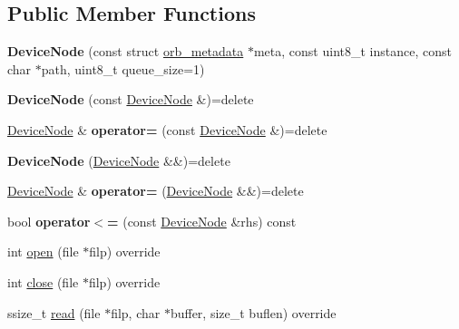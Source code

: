 \subsection*{Public Member Functions}
\begin{DoxyCompactItemize}
\item 
\mbox{\label{classuORB_1_1DeviceNode_a34467219311e0a68acf87dd4f6cbdb5e}} 
{\bfseries Device\+Node} (const struct \hyperlink{structorb__metadata}{orb\+\_\+metadata} $\ast$meta, const uint8\+\_\+t instance, const char $\ast$path, uint8\+\_\+t queue\+\_\+size=1)
\item 
\mbox{\label{classuORB_1_1DeviceNode_aacdd104881aaad56bb52cee63b972c3d}} 
{\bfseries Device\+Node} (const \hyperlink{classuORB_1_1DeviceNode}{Device\+Node} \&)=delete
\item 
\mbox{\label{classuORB_1_1DeviceNode_a2819b13a6d7b7423f1bb61e01942cf4e}} 
\hyperlink{classuORB_1_1DeviceNode}{Device\+Node} \& {\bfseries operator=} (const \hyperlink{classuORB_1_1DeviceNode}{Device\+Node} \&)=delete
\item 
\mbox{\label{classuORB_1_1DeviceNode_abd5682d5d05a2dc8c31a4eb8190977f2}} 
{\bfseries Device\+Node} (\hyperlink{classuORB_1_1DeviceNode}{Device\+Node} \&\&)=delete
\item 
\mbox{\label{classuORB_1_1DeviceNode_aa7778a6a4195acf63d643b3cad431601}} 
\hyperlink{classuORB_1_1DeviceNode}{Device\+Node} \& {\bfseries operator=} (\hyperlink{classuORB_1_1DeviceNode}{Device\+Node} \&\&)=delete
\item 
\mbox{\label{classuORB_1_1DeviceNode_ae1bd88ecf550076f7c7f791b9be2af13}} 
bool {\bfseries operator$<$=} (const \hyperlink{classuORB_1_1DeviceNode}{Device\+Node} \&rhs) const
\item 
int \hyperlink{classuORB_1_1DeviceNode_ae7f3782c9876a17b4aa6949440655f1f}{open} (file $\ast$filp) override
\item 
int \hyperlink{classuORB_1_1DeviceNode_a80ebf695636c701d3378525b6d0e4148}{close} (file $\ast$filp) override
\item 
ssize\+\_\+t \hyperlink{classuORB_1_1DeviceNode_ada5db18aae221ae76e023651cbf9461c}{read} (file $\ast$filp, char $\ast$buffer, size\+\_\+t buflen) override

\end{DoxyCompactItemize}
